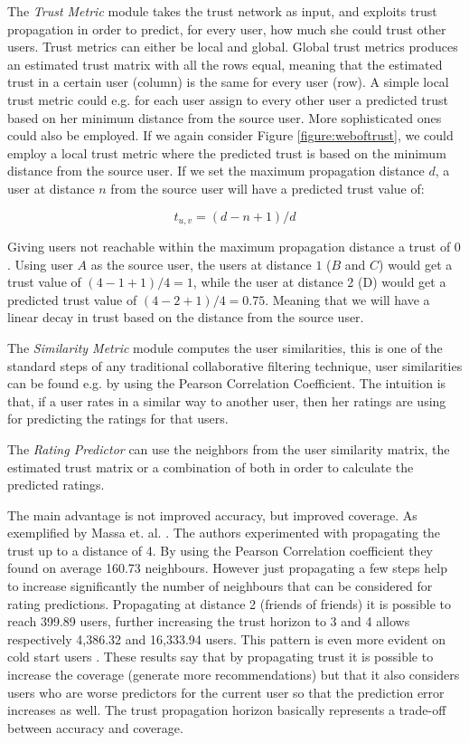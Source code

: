 The \emph{Trust Metric} module takes the trust network as input, and exploits trust propagation in order to predict, for every user, how much she could trust other users. Trust metrics can either be local and global. Global trust metrics produces an estimated trust matrix with all the rows equal, meaning that the estimated trust in a certain user (column) is the same for every user (row). A simple local trust metric could e.g. for each user assign to every other user a predicted trust based on her minimum distance from the source user. More sophisticated ones could also be employed. If we again consider Figure \ref{figure:weboftrust}, we could employ a local trust metric where the predicted trust is based on the minimum distance from the source user. If we set the maximum propagation distance $d$, a user at distance $n$ from the source user will have a predicted trust value of:

\begin{equation}
t_{u,v} = (d-n+1)/d
\end{equation}

Giving users not reachable within the maximum propagation distance a trust of $0$. Using user $A$ as the source user, the users at distance $1$ ($B$ and $C$) would get a trust value of $(4-1+1)/4 = 1$, while the user at distance 2 (D) would get a predicted trust value of $(4-2+1)/4 = 0.75$. Meaning that we will have a linear decay in trust based on the distance from the source user.

The \emph{Similarity Metric} module computes the user similarities, this is one of the standard steps of any traditional collaborative filtering technique, user similarities can be found e.g. by using the Pearson Correlation Coefficient. The intuition is that, if a user rates in a similar way to another user, then her ratings are using for predicting the ratings for that users.

The \emph{Rating Predictor} can use the neighbors from the user similarity matrix, the estimated trust matrix or a combination of both in order to calculate the predicted ratings.

The main advantage is not improved accuracy, but improved coverage. As exemplified by Massa et. al. \cite{Massa2007}. The authors experimented with propagating the trust up to a distance of 4. By using the Pearson Correlation coefficient they found on average 160.73 neighbours. However just propagating a few steps help to increase significantly the number of neighbours that can be considered for rating predictions. Propagating at distance 2 (friends of friends) it is possible to reach 399.89 users, further increasing the trust horizon to 3 and 4 allows respectively 4,386.32 and 16,333.94 users. This pattern is even more evident on cold start users \cite{Massa2004}. These results say that by propagating trust it is possible to increase the coverage (generate more recommendations) but that it also considers users who are worse predictors for the current user so that the prediction error increases as well. The trust propagation horizon basically represents a trade-off between accuracy and coverage.

